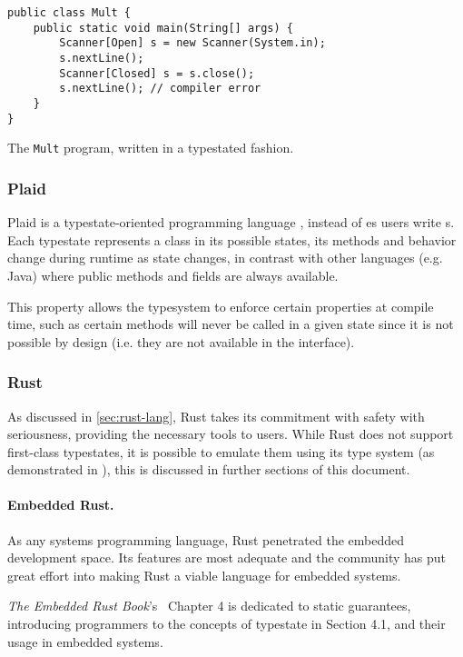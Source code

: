 \begin{listing}
    \centering
    \begin{verbatim}
public class Mult {
    public static void main(String[] args) {
        Scanner[Open] s = new Scanner(System.in);
        s.nextLine();
        Scanner[Closed] s = s.close();
        s.nextLine(); // compiler error
    }
}
    \end{verbatim}
    \caption{The \texttt{Mult} program, written in a typestated fashion.}
    \label{fig:java-mult-typestate}
\end{listing}

\subsubsection*{Plaid}

Plaid is a typestate-oriented programming language \autocite{Aldrich2009},
instead of es users write s.
Each typestate represents a class in its possible states,
its methods and behavior change during runtime as state changes,
in contrast with other languages (e.g. Java) where public methods and fields are always available.

This property allows the typesystem to enforce certain properties at compile time,
such as certain methods will never be called in a given state since it is not possible by design
(i.e. they are not available in the interface).


\subsubsection*{Rust}

As discussed in \autoref{sec:rust-lang}, Rust takes its commitment with safety with seriousness,
providing the necessary tools to users.
While Rust does not support first-class typestates,
it is possible to emulate them using its type system (as demonstrated in \autocite{Duarte2020}),
this is discussed in further sections of this document.

\paragraph{Embedded Rust.} As any systems programming language, Rust penetrated the embedded development space.
Its features are most adequate and the community has put great effort into making Rust a viable language for embedded systems.

\emph{The Embedded Rust Book}'s~\autocite{Rust2021} Chapter 4 is dedicated to static guarantees,
introducing programmers to the concepts of typestate in Section 4.1, and their usage in embedded systems.

